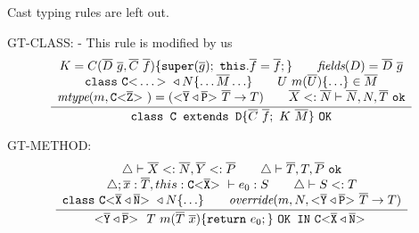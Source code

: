 Cast typing rules are left out.

GT-CLASS: - This rule is modified by us
\begin{align*}
\frac{\displaystyle 
  \begin{array}{c}
  K = C(\overline{D} \ \overline{g}, \overline{C} \ \overline{f}) \{ \texttt{super}(\overline{g}); \ \texttt{this}.\overline{f}=\overline{f}; \} 
  \quad \quad \textit{fields}(D) = \overline{D} \ \overline{g} \\
  \texttt{class}\ \mathtt{C {\tt <} \ldots {\tt >} \ } \triangleleft N \{ \ldots \overline{M} \ldots \} \quad \quad 
  U\ m(\overline{U}) \{ \ldots \} \in \overline{M} \\
  \textit{mtype}(m, \mathtt{C {\tt <} \overline{Z} {\tt >} \ }) = (\mathtt{ {\tt <} \overline{Y} \triangleleft \overline{P} {\tt >} \ } \overline{T} \to T)
  \quad \quad \overline{X} <: \overline{N} \vdash \overline{N}, N, \overline{T}\ \texttt{ok}
\end{array}
  }{\displaystyle \texttt{class C extends D}\{ \overline{C} \ \overline{f}; \ K \ \overline{M} \} \ \texttt{OK}}
\end{align*}

GT-METHOD:
\begin{align*}
\frac{\displaystyle \begin{array}{c}
\triangle \vdash \overline{X} <: \overline{N}, \overline{Y} <: \overline{P} \quad \quad 
\triangle \vdash \overline{T}, T, \overline{P} \ \texttt{ok} \\
\triangle ; \overline{x}:\overline{T}, this : \mathtt{C {\tt <} \overline{X} {\tt >} \ } \vdash e_0 : S \quad \quad
\triangle \vdash S <: T \\
\texttt{class}\ \mathtt{C {\tt <} \overline{X} \triangleleft \overline{N} {\tt >} \ } \triangleleft N \{ \ldots \} \quad \quad
\textit{override}(m, N, \mathtt{ {\tt <} \overline{Y} \triangleleft \overline{P} {\tt >} \ } \overline{T} \to T)
\end{array}}{\displaystyle \mathtt{ {\tt <} \overline{Y} \triangleleft \overline{P} {\tt >} \ }\ T \ m(\overline{T}\ \overline{x}) \{ \texttt{return} \ e_0; \} \ \texttt{OK IN}\ \mathtt{C {\tt <} \overline{X} \triangleleft \overline{N} {\tt >} \ }}
\end{align*}
